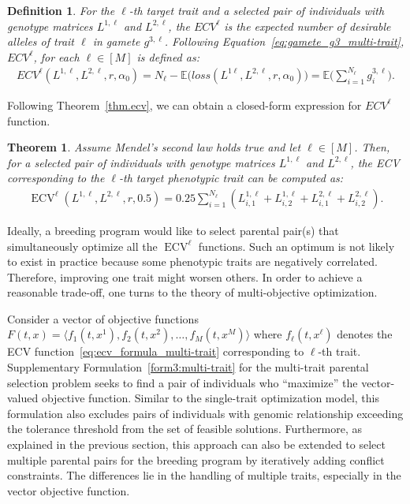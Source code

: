 \documentclass[12pt, a4paper, bibliography=totoc]{scrartcl}
\newtheorem{theorem}{Theorem}
\newtheorem{definition}{Definition}
\DeclareMathOperator*{\ECV}{ECV}
\begin{document}
\begin{definition} \label{defn.ecv_multi-trait}
For the $\ell$-th target trait and a selected pair of individuals with genotype matrices $L^{1,\ell}$ and $L^{2,\ell}$, the $ECV^{\ell}$ is the expected number of desirable alleles of trait $\ell$ in gamete $g^{3,\ell}$. Following Equation~\eqref{eq:gamete_g3_multi-trait}, $ECV^{\ell}$, for each $\ell \in [M]$ is defined as:
\begin{align} \label{eq:ecv_with_loss_func_multi-trait}
    ECV^{\ell}(L^{1,\ell},L^{2,\ell},r,\alpha_0)= N_{\ell} - \mathbb{E}\big(loss(L^{1\ell},L^{2,\ell},r,\alpha_0)\big) = \mathbb{E}\bigg(\sum_{i=1}^{N_{\ell}}g_i^{3,\ell}\bigg).
\end{align}
\end{definition}
Following Theorem~\ref{thm.ecv}, we can obtain a closed-form expression for $ECV^{\ell}$ function.
 
\begin{theorem} \label{thm.ecv_multi-trait}
Assume Mendel's second law holds true and let $\ell\in[M]$. Then, for a selected pair of individuals with genotype matrices $L^{1,\ell}$ and $L^{2,\ell}$, the ECV corresponding to the $\ell$-th target phenotypic trait can be computed as:
\begin{align} \label{eq:ecv_formula_multi-trait}
   {\ECV}^\ell(L^{1,\ell},L^{2,\ell},r,0.5)=0.25\sum_{i=1}^{N_{\ell}} (L^{1,\ell}_{i,1}+L^{1,\ell}_{i,2}+L^{2,\ell}_{i,1}+L^{2,\ell}_{i,2}).
\end{align}
\end{theorem}

Ideally, a breeding program would like to select parental pair(s) that simultaneously optimize all the $\ECV^\ell$ functions. Such an optimum is not likely to exist in practice because some phenotypic traits are negatively correlated.  Therefore, improving one trait might worsen others. In order to achieve a reasonable trade-off, one turns to  the theory of  multi-objective optimization. 


Consider a vector of objective functions $F(t,x)=\langle f_1(t,x^1), f_2(t,x^2),\ldots,f_M(t,x^M)\rangle$ where $f_{\ell}(t,x^\ell)$ denotes the ECV function~\eqref{eq:ecv_formula_multi-trait} corresponding to $\ell$-th trait. Supplementary  Formulation~\eqref{form3:multi-trait} for the  multi-trait parental selection problem seeks to find a pair of individuals who ``maximize'' the vector-valued objective function. Similar to the single-trait optimization model, this formulation also excludes pairs of individuals with  genomic relationship exceeding the tolerance threshold from the set of feasible solutions. Furthermore, as explained in the previous section, this approach can also be extended to select multiple parental pairs for the breeding program by iteratively adding conflict constraints. The differences lie in the handling of multiple traits, especially in the vector objective function.
\end{document}

